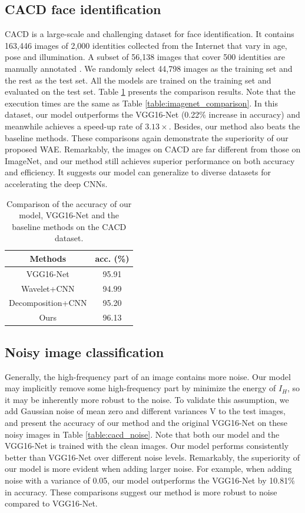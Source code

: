 \documentclass[letterpaper]{article} %
\begin{document}
\subsection{CACD face identification}
CACD is a large-scale and challenging dataset for face identification. It contains 163,446 images of 2,000 identities collected from the Internet that vary in age, pose and illumination. A subset of 56,138 images that cover 500 identities are manually annotated \cite{lin2017active}. We randomly select 44,798 images as the training set and the rest as the test set. All the models are trained on the training set and evaluated on the test set. Table \ref{table:cacd_comparison} presents the comparison results. Note that the execution times are the same as Table \ref{table:imagenet_comparison}. In this dataset, our model outperforms the VGG16-Net (0.22\% increase in accuracy) and meanwhile achieves a speed-up rate of $3.13\times$. Besides, our method also beats the baseline methods. These comparisons again demonstrate the superiority of our proposed WAE. Remarkably, the images on CACD are far different from those on ImageNet, and our method still achieves superior performance on both accuracy and efficiency. It suggests our model can generalize to diverse datasets for accelerating the deep CNNs.


\begin{table}[htbp]
\centering
\begin{tabular}{c|c}
\hline
\centering  Methods  & acc. (\%) \\
\hline
\hline
VGG16-Net    & 95.91   \\
Wavelet+CNN      &   94.99  \\
Decomposition+CNN      &   95.20 \\
Ours   & 96.13   \\
\hline
\end{tabular}
\caption{Comparison of the accuracy of our model, VGG16-Net and the baseline methods on the CACD dataset.}
\label{table:cacd_comparison}
\end{table}


\subsection{Noisy image classification}
Generally, the high-frequency part of an image contains more noise. Our model may implicitly remove some high-frequency part by minimize the energy of $I_H$, so it may be inherently more robust to the noise. To validate this assumption, we add Gaussian noise of mean zero and different variances V to the test images, and present the accuracy of our method and the original VGG16-Net on these noisy images in Table \ref{table:cacd_noise}. Note that both our model and the VGG16-Net is trained with the clean images. Our model performs consistently better than VGG16-Net over different noise levels. Remarkably, the superiority of our model is more evident when adding larger noise. For example, when adding noise with a variance of 0.05, our model outperforms the VGG16-Net by 10.81\% in accuracy. These comparisons suggest our method is more robust to noise compared to VGG16-Net.
\end{document}

